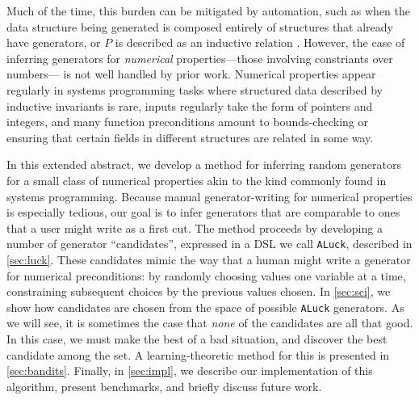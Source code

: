 \documentclass[sigconf,nonacm,review,anonymous]{acmart}
\begin{document}
Much of the time, this burden can be mitigated by automation, such as when the data structure being generated
is composed entirely of structures that already have generators, or $P$ is described as an inductive
relation \cite{gggir}. However, the case of inferring generators for \emph{numerical} properties---those involving constriants over numbers--- is not well
handled by prior work. Numerical properties appear regularly in
systems programming tasks \cite{ironfleet} where structured data described by inductive invariants is rare, inputs regularly
take the form of pointers and integers, and many function preconditions amount to bounds-checking or ensuring
that certain fields in different structures are related in some way.

In this extended abstract, we develop a method for inferring random generators for a small class of numerical properties akin
to the kind commonly found in systems programming. Because manual generator-writing for numerical properties is especially
tedious, our goal is to infer generators that are comparable to ones that a user might write as a first cut.
The method proceeds by developing a number of generator ``candidates'', expressed in a DSL we call \texttt{ALuck}, described in \autoref{sec:luck}.
These candidates mimic the way that a human might write a generator for numerical preconditions: by randomly choosing values
one variable at a time, constraining subsequent choices by the previous values chosen. In \autoref{sec:sci}, we show how candidates
are chosen from the space of possible \texttt{ALuck} generators.
As we will see, it is sometimes the case that \emph{none} of the candidates are all that good. In this case, we must make the best
of a bad situation, and discover the best candidate among the set. A learning-theoretic method for this is presented in \autoref{sec:bandits}.
Finally, in \autoref{sec:impl}, we describe our implementation of
this algorithm, present benchmarks, and briefly discuss future work.


\end{document}
